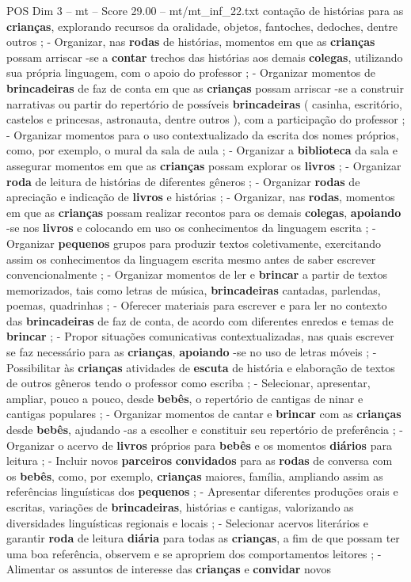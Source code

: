 \begin{textsample}{POS Dim 3 – mt – Score 29.00 – mt/mt\_inf\_22.txt}
contação de histórias para as \textbf{crianças}, explorando recursos da oralidade, objetos, fantoches, dedoches, dentre outros ; - Organizar, nas \textbf{rodas} de histórias, momentos em que as \textbf{crianças} possam arriscar -se a \textbf{contar} trechos das histórias aos demais \textbf{colegas}, utilizando sua própria linguagem, com o apoio do professor ; - Organizar momentos de \textbf{brincadeiras} de faz de conta em que as \textbf{crianças} possam arriscar -se a construir narrativas ou partir do repertório de possíveis \textbf{brincadeiras} ( casinha, escritório, castelos e princesas, astronauta, dentre outros ), com a participação do professor ; - Organizar momentos para o uso contextualizado da escrita dos nomes próprios, como, por exemplo, o mural da sala de aula ; - Organizar a \textbf{biblioteca} da sala e assegurar momentos em que as \textbf{crianças} possam explorar os \textbf{livros} ; - Organizar \textbf{roda} de leitura de histórias de diferentes gêneros ; - Organizar \textbf{rodas} de apreciação e indicação de \textbf{livros} e histórias ; - Organizar, nas \textbf{rodas}, momentos em que as \textbf{crianças} possam realizar recontos para os demais \textbf{colegas}, \textbf{apoiando} -se nos \textbf{livros} e colocando em uso os conhecimentos da linguagem escrita ; - Organizar \textbf{pequenos} grupos para produzir textos coletivamente, exercitando assim os conhecimentos da linguagem escrita mesmo antes de saber escrever convencionalmente ; - Organizar momentos de ler e \textbf{brincar} a partir de textos memorizados, tais como letras de música, \textbf{brincadeiras} cantadas, parlendas, poemas, quadrinhas ; - Oferecer materiais para escrever e para ler no contexto das \textbf{brincadeiras} de faz de conta, de acordo com diferentes enredos e temas de \textbf{brincar} ; - Propor situações comunicativas contextualizadas, nas quais escrever se faz necessário para as \textbf{crianças}, \textbf{apoiando} -se no uso de letras móveis ; - Possibilitar às \textbf{crianças} atividades de \textbf{escuta} de história e elaboração de textos de outros gêneros tendo o professor como escriba ; - Selecionar, apresentar, ampliar, pouco a pouco, desde \textbf{bebês}, o repertório de cantigas de ninar e cantigas populares ; - Organizar momentos de cantar e \textbf{brincar} com as \textbf{crianças} desde \textbf{bebês}, ajudando -as a escolher e constituir seu repertório de preferência ; - Organizar o acervo de \textbf{livros} próprios para \textbf{bebês} e os momentos \textbf{diários} para leitura ; - Incluir novos \textbf{parceiros} \textbf{convidados} para as \textbf{rodas} de conversa com os \textbf{bebês}, como, por exemplo, \textbf{crianças} maiores, família, ampliando assim as referências linguísticas dos \textbf{pequenos} ; - Apresentar diferentes produções orais e escritas, variações de \textbf{brincadeiras}, histórias e cantigas, valorizando as diversidades linguísticas regionais e locais ; - Selecionar acervos literários e garantir \textbf{roda} de leitura \textbf{diária} para todas as \textbf{crianças}, a fim de que possam ter uma boa referência, observem e se apropriem dos comportamentos leitores ; - Alimentar os assuntos de interesse das \textbf{crianças} e \textbf{convidar} novos 
\end{textsample}
